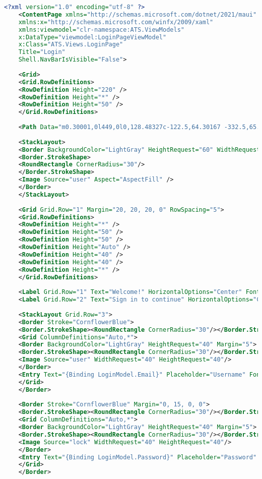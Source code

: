 \begin{lstlisting}[language=XML, caption=Gebruikersinterface van de loginpagina, label=lst:login-xaml]
    <?xml version="1.0" encoding="utf-8" ?>
    <ContentPage xmlns="http://schemas.microsoft.com/dotnet/2021/maui"
    xmlns:x="http://schemas.microsoft.com/winfx/2009/xaml"
    xmlns:viewmodel="clr-namespace:ATS.ViewModels"
    x:DataType="viewmodel:LoginPageViewModel"
    x:Class="ATS.Views.LoginPage"
    Title="Login"
    Shell.NavBarIsVisible="False">
    
    <Grid>
    <Grid.RowDefinitions>
    <RowDefinition Height="220" />
    <RowDefinition Height="*" />
    <RowDefinition Height="50" />
    </Grid.RowDefinitions>
    
    <Path Data="m0.30001,0l449,0l0,128.48327c-122.5,64.30167 -332.5,65.89076 -449,7.2429c0,-45.25313 0,-90.47304 0,-135.72617z" Fill="CornflowerBlue" />
    
    <StackLayout>
    <Border BackgroundColor="LightGray" HeightRequest="60" WidthRequest="60" Margin="0, 100, 0, 0" HorizontalOptions="Center">
    <Border.StrokeShape>
    <RoundRectangle CornerRadius="30"/>
    </Border.StrokeShape>
    <Image Source="user" Aspect="AspectFill" />
    </Border>
    </StackLayout>
    
    <Grid Grid.Row="1" Margin="20, 20, 20, 0" RowSpacing="5">
    <Grid.RowDefinitions>
    <RowDefinition Height="*" />
    <RowDefinition Height="50" />
    <RowDefinition Height="50" />
    <RowDefinition Height="Auto" />
    <RowDefinition Height="40" />
    <RowDefinition Height="40" />
    <RowDefinition Height="*" />
    </Grid.RowDefinitions>
    
    <Label Grid.Row="1" Text="Welcome!" HorizontalOptions="Center" FontSize="Title" FontAttributes="Bold"/>
    <Label Grid.Row="2" Text="Sign in to continue" HorizontalOptions="Center" FontSize="Subtitle"/>
    
    <StackLayout Grid.Row="3">
    <Border Stroke="CornflowerBlue">
    <Border.StrokeShape><RoundRectangle CornerRadius="30"/></Border.StrokeShape>
    <Grid ColumnDefinitions="Auto,*">
    <Border BackgroundColor="LightGray" HeightRequest="40" Margin="5">
    <Border.StrokeShape><RoundRectangle CornerRadius="30"/></Border.StrokeShape>
    <Image Source="user" WidthRequest="40" HeightRequest="40"/>
    </Border>
    <Entry Text="{Binding LoginModel.Email}" Placeholder="Username" FontAttributes="Bold"/>
    </Grid>
    </Border>
    
    <Border Stroke="CornflowerBlue" Margin="0, 15, 0, 0">
    <Border.StrokeShape><RoundRectangle CornerRadius="30"/></Border.StrokeShape>
    <Grid ColumnDefinitions="Auto,*">
    <Border BackgroundColor="LightGray" HeightRequest="40" Margin="5">
    <Border.StrokeShape><RoundRectangle CornerRadius="30"/></Border.StrokeShape>
    <Image Source="lock" WidthRequest="40" HeightRequest="40"/>
    </Border>
    <Entry Text="{Binding LoginModel.Password}" Placeholder="Password" FontAttributes="Bold"/>
    </Grid>
    </Border>
    

\end{lstlisting}
